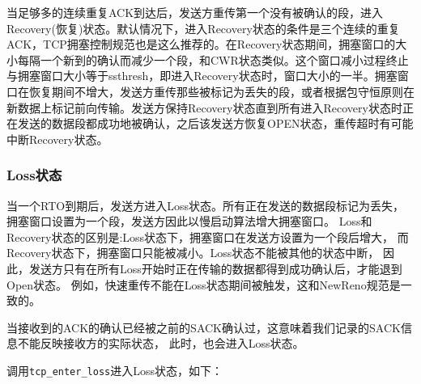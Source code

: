             当足够多的连续重复ACK到达后，发送方重传第一个没有被确认的段，进入Recovery(恢复)状态。默认情况下，进入Recovery状态的条件是三个连续的重复ACK，TCP拥塞控制规范也是这么推荐的。在Recovery状态期间，拥塞窗口的大小每隔一个新到的确认而减少一个段，和CWR状态类似。这个窗口减小过程终止与拥塞窗口大小等于ssthresh，即进入Recovery状态时，窗口大小的一半。拥塞窗口在恢复期间不增大，发送方重传那些被标记为丢失的段，或者根据包守恒原则在新数据上标记前向传输。发送方保持Recovery状态直到所有进入Recovery状态时正在发送的数据段都成功地被确认，之后该发送方恢复OPEN状态，重传超时有可能中断Recovery状态。

        \subsubsection{Loss状态}
            \label{CongestionState:Loss}
            当一个RTO到期后，发送方进入Loss状态。所有正在发送的数据段标记为丢失，
            拥塞窗口设置为一个段，发送方因此以慢启动算法增大拥塞窗口。
            Loss和Recovery状态的区别是:Loss状态下，拥塞窗口在发送方设置为一个段后增大，
            而Recovery状态下，拥塞窗口只能被减小。Loss状态不能被其他的状态中断，
            因此，发送方只有在所有Loss开始时正在传输的数据都得到成功确认后，才能退到Open状态。
            例如，快速重传不能在Loss状态期间被触发，这和NewReno规范是一致的。

            当接收到的ACK的确认已经被之前的SACK确认过，这意味着我们记录的SACK信息不能反映接收方的实际状态，
            此时，也会进入Loss状态。

            调用\texttt{tcp_enter_loss}进入Loss状态，如下：

